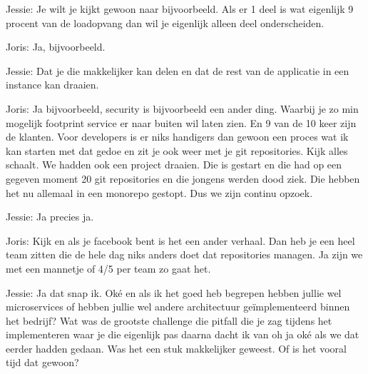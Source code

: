 Jessie: Je wilt je kijkt gewoon naar bijvoorbeeld. Als er 1 deel is wat eigenlijk 9 procent van de loadopvang dan wil je eigenlijk alleen deel onderscheiden.

Joris: Ja, bijvoorbeeld.

Jessie: Dat je die makkelijker kan delen en dat de rest van de applicatie in een instance kan draaien.

Joris: Ja bijvoorbeeld, security is bijvoorbeeld een ander ding. Waarbij je zo min mogelijk footprint service er naar buiten wil laten zien. En 9 van de 10 keer zijn de klanten. Voor developers is er niks handigers dan gewoon een proces wat ik kan starten met dat gedoe en zit je ook weer met je git repositories. Kijk alles schaalt. We hadden ook een project draaien. Die is gestart en die had op een gegeven moment 20 git repositories en die jongens werden dood ziek. Die hebben het nu allemaal in een monorepo gestopt. Dus we zijn continu opzoek.

Jessie: Ja precies ja.

Joris: Kijk en als je facebook bent is het een ander verhaal. Dan heb je een heel team zitten die de hele dag niks anders doet dat repositories managen. Ja zijn we met een mannetje of 4/5 per team zo gaat het.

Jessie: Ja dat snap ik. Oké en als ik het goed heb begrepen hebben jullie wel microservices of hebben jullie wel andere architectuur geïmplementeerd binnen het bedrijf? Wat was de grootste challenge die pitfall die je zag tijdens het implementeren waar je die eigenlijk pas daarna dacht ik van oh ja oké als we dat eerder hadden gedaan. Was het een stuk makkelijker geweest. Of is het vooral tijd dat gewoon?

